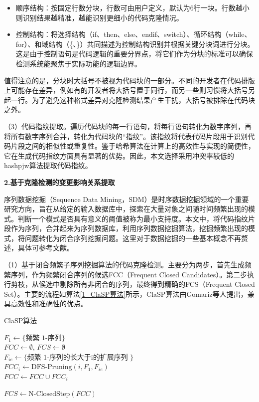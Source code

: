\begin{itemize}
    \item 顺序结构：按固定行数分块，行数可由用户定义，默认为6行一块。行数越小则识别结果越精准，越能识别更细小的代码克隆情况。
    
    \item 控制结构：将选择结构（if、then、else、endif、switch）、循环结构（while、for）、和域结构（\{、\}）共同描述为控制结构识别并根据关键分块词进行分块。这是由于控制语句是代码逻辑的重要分界点，将它们作为分块的标准可以确保检测系统能聚焦于实际功能的逻辑边界。
\end{itemize}

值得注意的是，分块时大括号不被视为代码块的一部分。不同的开发者在代码排版上可能存在差异，例如有的开发者将大括号置于同行，而另一些则习惯将大括号另起一行。为了避免这种格式差异对克隆检测结果产生干扰，大括号被排除在代码块之外。

（3）代码指纹提取。遍历代码块的每一行语句，将每行语句转化为数字序列，再将所有数字序列合并，转化为代码块的“指纹”。该指纹将代表代码片段用于识别代码片段之间的相似性或重复性。鉴于哈希算法在计算上的高效性与实现的简便性，它在生成代码指纹方面具有显著的优势。因此，本文选择采用冲突率较低的hashpjw算法提取代码指纹。

\noindent \textbf{2.基于克隆检测的变更影响关系提取}

序列数据挖掘（Sequence Data Mining，SDM）是时序数据挖掘领域的一个重要研究方向，旨在从给定的输入数据库中，探索在大量对象之间随时间频繁出现的模式。判断一个模式是否具有意义的阈值被称为最小支持度。本文中，将代码指纹片段作为序列，合并起来为序列数据库，利用序列数据挖掘算法，挖掘频繁出现的模式，将问题转化为闭合序列挖掘问题。这里对于数据挖掘的一些基本概念不再赘述，具体可参考文献\cite{2013ClaSP}。

（1）基于闭合频繁子序列挖掘算法的代码克隆检测。主要分为两步，首先生成频繁序列，作为频繁闭合序列的候选FCC（Frequent Closed Candidates）。第二步执行剪枝，从候选中剔除所有非闭合的序列，最终得到精确的FCS（Frequent Closed Set）。主要的流程如算法\ref{1_ClaSP算法}所示，ClaSP算法由Gomariz等人\cite{2013ClaSP}提出，兼具高效性和准确性的优点。

\begin{algorithm}
\caption{ClaSP算法}
\label{1_ClaSP算法}
 $F_1 \gets \{\text{频繁 1-序列}\}$ \\
 $FCC \gets \emptyset$, $FCS \gets \emptyset$  \\
{
    $F_{ie} \gets \{\text{频繁 1-序列的长大于i的扩展序列 } \}$ \\
    $FCC_i \gets \text{DFS-Pruning}(i, F_1, F_{ie})$ \\
    $FCC \gets FCC \cup FCC_i$
}

 $FCS \gets \text{N-ClosedStep}(FCC)$
\end{algorithm}



